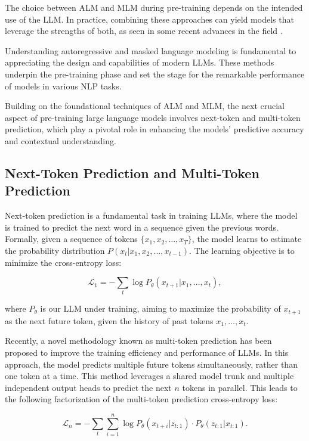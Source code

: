 The choice between ALM and MLM during pre-training depends on the intended use of the LLM. In practice, combining these approaches can yield models that leverage the strengths of both, as seen in some recent advances in the field \cite{lewis2019bart}.

Understanding autoregressive and masked language modeling is fundamental to appreciating the design and capabilities of modern LLMs. These methods underpin the pre-training phase and set the stage for the remarkable performance of models in various NLP tasks.

Building on the foundational techniques of ALM and MLM, the next crucial aspect of pre-training large language models involves next-token and multi-token prediction, which play a pivotal role in enhancing the models’ predictive accuracy and contextual understanding.

\subsection{Next-Token Prediction and Multi-Token Prediction}

Next-token prediction is a fundamental task in training LLMs, where the model is trained to predict the next word in a sequence given the previous words. Formally, given a sequence of tokens \( \{x_1, x_2, \ldots, x_T\} \), the model learns to estimate the probability distribution \( P(x_t | x_1, x_2, \ldots, x_{t-1}) \). The learning objective is to minimize the cross-entropy loss:

\begin{equation}
    \mathcal{L}_1 = - \sum_{t} \log P_\theta (x_{t+1} | x_1, \ldots, x_t),
\end{equation}

where \( P_\theta \) is our LLM under training, aiming to maximize the probability of \( {x_{t+1}} \) as the next future token, given the history of past tokens \( {x_1, \ldots, x_t} \).

Recently, a novel methodology known as multi-token prediction has been proposed to improve the training efficiency and performance of LLMs. In this approach, the model predicts multiple future tokens simultaneously, rather than one token at a time. This method leverages a shared model trunk and multiple independent output heads to predict the next \( n \) tokens in parallel. This leads to the following factorization of the multi-token prediction cross-entropy
loss:

\begin{equation}
    \mathcal{L}_n = - \sum_{t} \sum_{i=1}^{n} \log P_\theta (x_{t+i} | z_{t:1}) \cdot P_\theta(z_{t:1} | x_{t:1}).
\end{equation}

